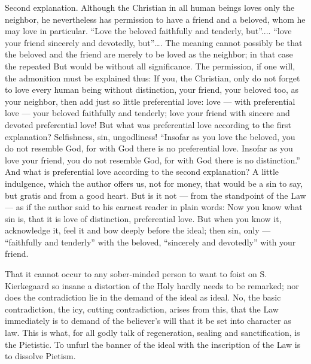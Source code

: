 \documentclass[12pt,a4paper,openany]{book}
\newcommand{\opage}[1]{\marginnote{\footnotesize\textit{[#1]}}}
\begin{document}
Second explanation. Although the Christian in all
human beings loves only the neighbor, he nevertheless has permission
to have a friend and a beloved, whom he may love in particular.
``Love the beloved faithfully and tenderly, but''....
``love your friend sincerely and devotedly, but''\dots{}. The meaning
cannot possibly be that the beloved and the friend are merely
to be loved as the neighbor; in that case the repeated
But would be without all significance. The permission, if one
will, the admonition must be explained thus: If you, the
Christian, only do not forget to love every human being without
distinction, your friend, your beloved too, as your neighbor, then add
just so little preferential love: love --- with preferential love
--- your beloved faithfully and tenderly; love your friend with
sincere and devoted preferential love! But what was
preferential love according to the first explanation? Selfishness,
sin, ungodliness! ``Insofar as you love the beloved,
you do not resemble God, for with God there is no preferential love.
Insofar as you love your friend, you do not resemble God, for
with God there is no distinction.'' And what is preferential love
according to the second explanation? A little indulgence, which the author
offers us, not for money, that would be a sin to say,
but gratis and from a good heart. But is it not
--- from the standpoint of the Law --- as if the author said to his
earnest reader in plain words: Now you know what sin
is, that it is love of distinction, preferential love. But
when you know it, acknowledge it, feel it and bow
\setcounter{footnote}{0}%
\opage{510}deeply before the ideal; then sin, only --- ``faithfully and tenderly'' with
the beloved, ``sincerely and devotedly'' with your friend.

That it cannot occur to any sober-minded person
to want to foist on S. Kierkegaard so insane a distortion
of the Holy hardly needs to be remarked;
nor does the contradiction lie in the demand of the ideal
as ideal. No, the basic contradiction, the icy, cutting
contradiction, arises from this, that the Law immediately
is to demand of the believer's will that it be set into character
as law. This is what, for all godly talk of
regeneration, sealing and sanctification, is the Pietistic.
To unfurl the banner of the ideal with the inscription of the Law is to
dissolve Pietism.
\end{document}
